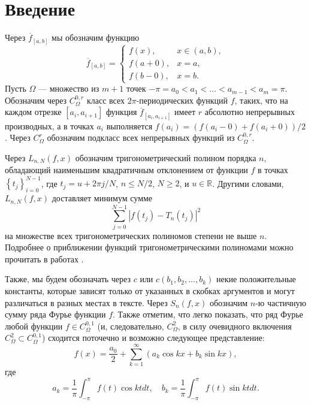 \section{Введение}
Через $\overline{f}_{[a,b]}$ мы обозначим функцию
\begin{equation*}
	\overline{f}_{[a,b]} =
	\begin{cases}
		f(x), & x \in (a,b), \\
		f(a + 0), & x = a,\\
		f(b - 0), & x = b.
	\end{cases}
\end{equation*}
Пусть $\Omega$ --- множество из $m+1$ точек $-\pi=a_{0}<a_{1}<\ldots<a_{m-1}<a_{m}=\pi$.
Обозначим через $C_\Omega^{0,r}$ класс всех $2\pi$-периодических функций $f$,
таких, что на каждом отрезке $[a_i, a_{i+1}]$ функция $\overline{f}_{[a_i, a_{i+1}]}$ имеет
$r$ абсолютно непрерывных производных, а в точках $a_i$ выполняется
 $f(a_i) = (f(a_i - 0) + f(a_i + 0)) / 2$.
Через $C_\Omega^{r}$ обозначим подкласс всех непрерывных функций из $C_\Omega^{0,r}$.

Через $L_{n,N}(f,x)$ обозначим
тригонометрический полином порядка $n$, обладающий наименьшим квадратичным отклонением от функции $f$ в точках $\left\{t_{j}\right\} _{i=0}^{N-1}$,
где $t_{j}=u+2\pi j / N$, $n \leq N/2$, $N \geq 2$, и $u \in \mathbb{R}$.
Другими словами, $L_{n,N}(f,x)$ доставляет минимум сумме
$$
\sum_{j=0}^{N-1}\left|f(t_{j})-T_{n}(t_{j})\right|^{2}
$$
на множестве всех тригонометрических полиномов степени не выше $n$.
Подробнее о приближении функций тригонометрическими полиномами можно прочитать в работах
\cite{2_bernstein,4_erdos,7_kalashnikov,8_krilov,9_marcinkiewicz,10_marcinkiewicz,11_natanson,12_nikolsky,18_zigmund,17_turetsky}.

Также, мы будем обозначать через $c$ или $c(b_1, b_2, \ldots, b_k)$ некие положительные константы, которые зависят только от указанных в скобках аргументов и могут
различаться в разных местах в тексте.  Через $S_n(f,x)$ обозначим $n$-ю частичную сумму ряда Фурье функции $f$.
Также отметим, что легко показать, что ряд Фурье любой функции $f \in C_\Omega^{0,1}$ (и, следовательно, $C_\Omega^{2}$, в силу очевидного включения $C_\Omega^{2} \subset C_\Omega^{0,1}$)
сходится поточечно и возможно следующее представление:
\begin{equation}\label{f_as_Fourier}
	f(x) = \frac{a_0}{2} + \sum_{k=1}^{\infty} \left(a_k \cos kx + b_k \sin kx\right),
\end{equation}
где
\begin{equation}\label{akbk_definition}
	a_k = \frac1\pi \int_{-\pi}^{\pi} f(t) \cos kt dt,\quad b_k = \frac1\pi \int_{-\pi}^{\pi} f(t) \sin kt dt.
\end{equation}

